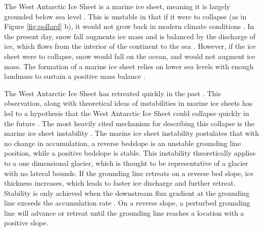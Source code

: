 The West Antarctic Ice Sheet is a marine ice sheet, meaning it is largely grounded below sea level \citep{fretwell2013bedmap2}. This is unstable in that if it were to collapse (as in Figure \ref{fig:pollard} b), it would not grow back in modern climate conditions \citep{oerlemans2021analytical}. In the present day, snow fall augments ice mass and is balanced by the discharge of ice, which flows from the interior of the continent to the sea \citep{rignot2002mass,paterson2016physics}. However, if the ice sheet were to collapse, snow would fall on the ocean, and would not augment ice mass. The formation of a marine ice sheet relies on lower sea levels with enough landmass to sustain  a positive mass balance \citep{oerlemans2021analytical}. 





The West Antarctic Ice Sheet has retreated quickly in the past \citep{yokoyama2016widespread}. This observation, along with theoretical ideas of instabilities in marine ice sheets \citep[e.g.][]{katz2010stability} has led to a hypothesis that the West Antarctic Ice Sheet could collapse quickly in the future \citep{vaughan2008west}.
The most heavily cited mechanism for describing this collapse is the marine ice sheet instability \citep{weertman1974stability}. The marine ice sheet instability postulates that with no change in accumulation, a reverse bedslope is an unstable grounding line position, while a positive bedslope is stable. This instability theoretically applies to a one dimensional glacier, which is thought to be representative of a glacier with no lateral bounds.  If the grounding line retreats on a reverse bed slope, ice thickness increases, which leads to faster ice discharge and  further retreat.  Stability is only achieved when the downstream flux gradient at the grounding line exceeds the accumulation rate \citep{haseloff2018effect}. On a reverse slope, a perturbed grounding line will advance or retreat until the grounding line reaches a location with a positive slope. 

